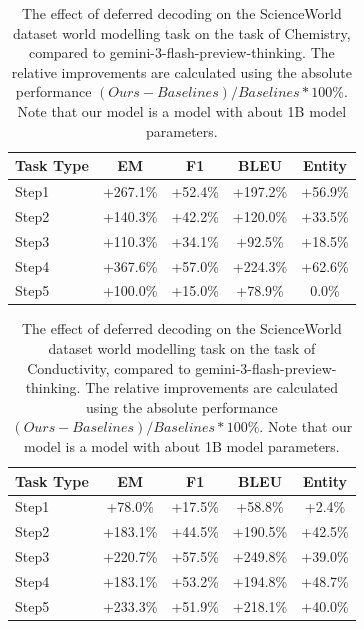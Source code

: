 \begin{table}[h]
\centering
    \setlength\tabcolsep{15pt}
    \setlength\extrarowheight{0pt}
\caption{The effect of deferred decoding on the ScienceWorld dataset \citep{wang-etal-2022-scienceworld} world modelling task on the task of Chemistry, compared to gemini-3-flash-preview-thinking. The relative improvements are calculated using the absolute performance $(Ours - Baselines) / Baselines * 100\%$. Note that our model is a model with about 1B model parameters.}
\label{tab:scienceworld3}
\begin{tabular}{lcccc}
\toprule
\textbf{Task Type} & \textbf{EM} & \textbf{F1}
  & \textbf{BLEU} & \textbf{Entity}\\
\midrule
Step1 & +267.1\% & +52.4\% & +197.2\% & +56.9\% \\
Step2 & +140.3\% & +42.2\% & +120.0\% & +33.5\% \\
Step3 & +110.3\% & +34.1\% & +92.5\% & +18.5\% \\
Step4 & +367.6\% & +57.0\% & +224.3\% & +62.6\% \\
Step5 & +100.0\% & +15.0\% & +78.9\% & 0.0\% \\

\bottomrule
\end{tabular}
\end{table}

\begin{table}[h]
\centering
    \setlength\tabcolsep{15pt}
    \setlength\extrarowheight{0pt}
\caption{The effect of deferred decoding on the ScienceWorld dataset \citep{wang-etal-2022-scienceworld} world modelling task on the task of Conductivity, compared to gemini-3-flash-preview-thinking. The relative improvements are calculated using the absolute performance $(Ours - Baselines) / Baselines * 100\%$. Note that our model is a model with about 1B model parameters.}
\label{tab:scienceworld4}
\begin{tabular}{lcccc}
\toprule
\textbf{Task Type} & \textbf{EM} & \textbf{F1}
  & \textbf{BLEU} & \textbf{Entity}\\
\midrule
Step1 & +78.0\% & +17.5\% & +58.8\% & +2.4\% \\
Step2 & +183.1\% & +44.5\% & +190.5\% & +42.5\% \\
Step3 & +220.7\% & +57.5\% & +249.8\% & +39.0\% \\
Step4 & +183.1\% & +53.2\% & +194.8\% & +48.7\% \\
Step5 & +233.3\% & +51.9\% & +218.1\% & +40.0\% \\

\bottomrule
\end{tabular}
\end{table}


